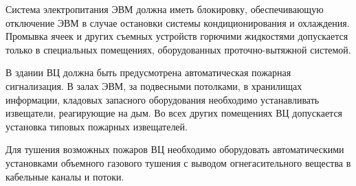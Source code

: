 Система электропитания ЭВМ должна иметь блокировку, обеспечивающую отключение ЭВМ в случае остановки системы кондиционирования и охлаждения. Промывка ячеек и других съемных устройств горючими жидкостями допускается только в специальных помещениях, оборудованных проточно-вытяжной системой.

В здании ВЦ должна быть предусмотрена автоматическая пожарная сигнализация. В залах ЭВМ, за подвесными потолками, в хранилищах информации, кладовых запасного оборудования необходимо устанавливать извещатели, реагирующие на дым. Во всех других помещениях ВЦ допускается установка типовых пожарных извещателей.

Для тушения возможных пожаров ВЦ необходимо оборудовать автоматическими установками объемного газового тушения с выводом огнегасительного вещества в кабельные каналы и потоки.